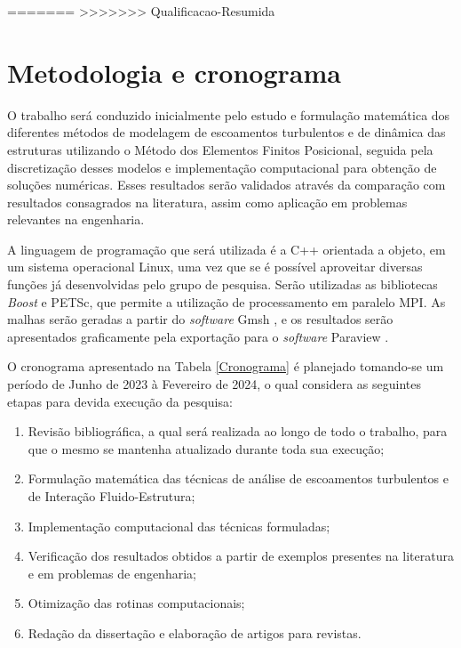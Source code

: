 \documentclass[_ArquivoPrincipal.tex]{subfiles}
\begin{document}
=======
>>>>>>> Qualificacao-Resumida
\chapter{Metodologia e cronograma} \label{MetodologiaCronograma}

O trabalho será conduzido inicialmente pelo estudo e formulação matemática dos diferentes métodos de modelagem de escoamentos turbulentos e de dinâmica das estruturas utilizando o Método dos Elementos Finitos Posicional, seguida pela discretização desses modelos e implementação computacional para obtenção de soluções numéricas. Esses resultados serão validados através da comparação com resultados consagrados na literatura, assim como aplicação em problemas relevantes na engenharia.

A linguagem de programação que será utilizada é a C++ orientada a objeto, em um sistema operacional Linux, uma vez que se é possível aproveitar diversas funções já desenvolvidas pelo grupo de pesquisa. Serão utilizadas as bibliotecas \textit{Boost} e PETSc, que permite a utilização de processamento em paralelo MPI. As malhas serão geradas a partir do \textit{software} Gmsh \cite{geuzaine2009gmsh}, e os resultados serão apresentados graficamente pela exportação para o \textit{software} Paraview \cite{ahrens2005paraview}.

O cronograma apresentado na Tabela \ref{Cronograma} é planejado tomando-se um período de Junho de 2023 à Fevereiro de 2024, o qual considera as seguintes etapas para devida execução da pesquisa:

\begin{enumerate}[label=\alph*.]
	\item\label{M:2} Revisão bibliográfica, a qual será realizada ao longo de todo o trabalho, para que o mesmo se mantenha atualizado durante toda sua execução;
	\item\label{M:3} Formulação matemática das técnicas de análise de escoamentos turbulentos e de Interação Fluido-Estrutura;
	\item\label{M:5} Implementação computacional das técnicas formuladas;
	\item\label{M:6} Verificação dos resultados obtidos a partir de exemplos presentes na literatura e em problemas de engenharia;
	\item\label{M:7} Otimização das rotinas computacionais;
	\item\label{M:8} Redação da dissertação e elaboração de artigos para revistas.
\end{enumerate}
\end{document}
